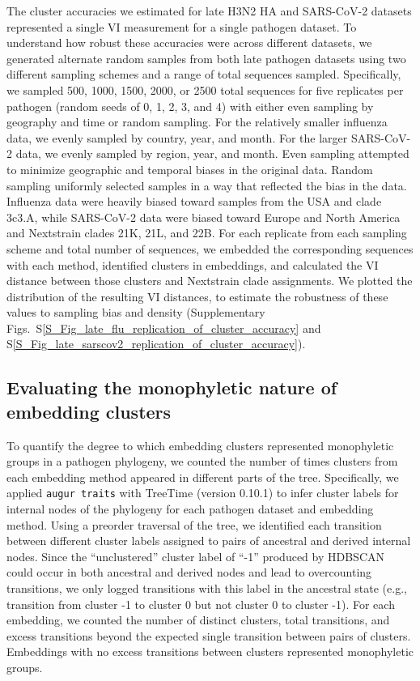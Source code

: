 \documentclass[webpdf,contemporary,large,single]{oup-authoring-template}%
\theoremstyle{thmstyleone}%
\theoremstyle{thmstyletwo}%
\theoremstyle{thmstylethree}%
\begin{document}
The cluster accuracies we estimated for late H3N2 HA and SARS-CoV-2 datasets represented a single VI measurement for a single pathogen dataset.
To understand how robust these accuracies were across different datasets, we generated alternate random samples from both late pathogen datasets using two different sampling schemes and a range of total sequences sampled.
Specifically, we sampled 500, 1000, 1500, 2000, or 2500 total sequences for five replicates per pathogen (random seeds of 0, 1, 2, 3, and 4) with either even sampling by geography and time or random sampling.
For the relatively smaller influenza data, we evenly sampled by country, year, and month.
For the larger SARS-CoV-2 data, we evenly sampled by region, year, and month.
Even sampling attempted to minimize geographic and temporal biases in the original data.
Random sampling uniformly selected samples in a way that reflected the bias in the data.
Influenza data were heavily biased toward samples from the USA and clade 3c3.A, while SARS-CoV-2 data were biased toward Europe and North America and Nextstrain clades 21K, 21L, and 22B.
For each replicate from each sampling scheme and total number of sequences, we embedded the corresponding sequences with each method, identified clusters in embeddings, and calculated the VI distance between those clusters and Nextstrain clade assignments.
We plotted the distribution of the resulting VI distances, to estimate the robustness of these values to sampling bias and density (Supplementary Figs.~S\ref{S_Fig_late_flu_replication_of_cluster_accuracy} and S\ref{S_Fig_late_sarscov2_replication_of_cluster_accuracy}).

\subsection{Evaluating the monophyletic nature of embedding clusters}

To quantify the degree to which embedding clusters represented monophyletic groups in a pathogen phylogeny, we counted the number of times clusters from each embedding method appeared in different parts of the tree.
Specifically, we applied \texttt{augur traits} with TreeTime (version 0.10.1) \citep{Sagulenko2018,Huddleston2021} to infer cluster labels for internal nodes of the phylogeny for each pathogen dataset and embedding method.
Using a preorder traversal of the tree, we identified each transition between different cluster labels assigned to pairs of ancestral and derived internal nodes.
Since the ``unclustered'' cluster label of ``-1'' produced by HDBSCAN could occur in both ancestral and derived nodes and lead to overcounting transitions, we only logged transitions with this label in the ancestral state (e.g., transition from cluster -1 to cluster 0 but not cluster 0 to cluster -1).
For each embedding, we counted the number of distinct clusters, total transitions, and excess transitions beyond the expected single transition between pairs of clusters.
Embeddings with no excess transitions between clusters represented monophyletic groups.
\end{document}
